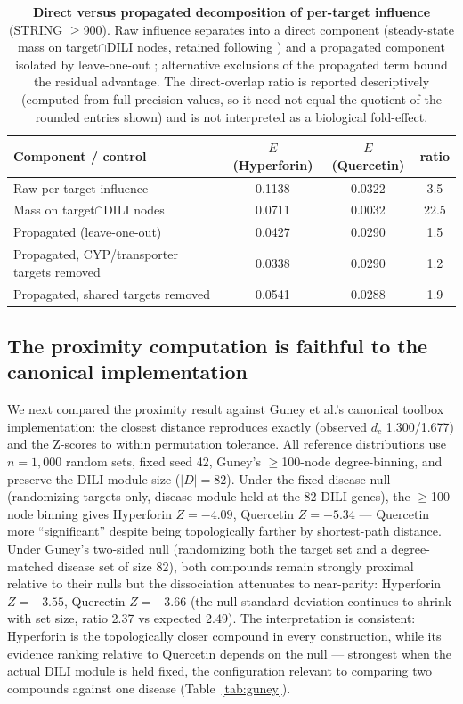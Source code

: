 \begin{table}[ht]
\centering
\caption{\textbf{Direct versus propagated decomposition of per-target influence} (STRING $\geq$900). Raw influence separates into a direct component (steady-state mass on target$\cap$DILI nodes, retained following \citet{Guney2016}) and a propagated component isolated by leave-one-out \citep{Kohler2008}; alternative exclusions of the propagated term bound the residual advantage. The direct-overlap ratio is reported descriptively (computed from full-precision values, so it need not equal the quotient of the rounded entries shown) and is not interpreted as a biological fold-effect.}
\label{tab:leakage}
\begin{tabular}{@{}l S[table-format=1.4] S[table-format=1.4] S[table-format=2.1]@{}}
\toprule
\textbf{Component / control} & {\textbf{$E$(Hyperforin)}} & {\textbf{$E$(Quercetin)}} & {\textbf{ratio}} \\
\midrule
Raw per-target influence & 0.1138 & 0.0322 & 3.5 \\
\quad Mass on target$\cap$DILI nodes & 0.0711 & 0.0032 & 22.5 \\
\quad Propagated (leave-one-out) & 0.0427 & 0.0290 & 1.5 \\
\midrule
Propagated, CYP/transporter targets removed & 0.0338 & 0.0290 & 1.2 \\
Propagated, shared targets removed & 0.0541 & 0.0288 & 1.9 \\
\bottomrule
\end{tabular}
\end{table}


\subsection{The proximity computation is faithful to the canonical implementation}

We next compared the proximity result against Guney et al.'s canonical toolbox implementation: the closest distance reproduces exactly (observed $d_c$ 1.300/1.677) and the Z-scores to within permutation tolerance. All reference distributions use $n=1{,}000$ random sets, fixed seed 42, Guney's $\geq$100-node degree-binning, and preserve the DILI module size ($|D|=82$). Under the fixed-disease null (randomizing targets only, disease module held at the 82 DILI genes), the $\geq$100-node binning gives Hyperforin $Z = -4.09$, Quercetin $Z = -5.34$ --- Quercetin more ``significant'' despite being topologically farther by shortest-path distance. Under Guney's two-sided null (randomizing both the target set and a degree-matched disease set of size 82), both compounds remain strongly proximal relative to their nulls but the dissociation attenuates to near-parity: Hyperforin $Z = -3.55$, Quercetin $Z = -3.66$ (the null standard deviation continues to shrink with set size, ratio 2.37 vs expected 2.49). The interpretation is consistent: Hyperforin is the topologically closer compound in every construction, while its evidence ranking relative to Quercetin depends on the null --- strongest when the actual DILI module is held fixed, the configuration relevant to comparing two compounds against one disease (Table~\ref{tab:guney}).

